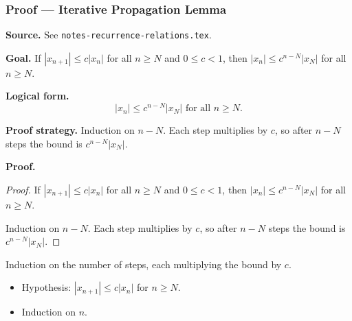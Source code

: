 
\clearpage
{}
\hypertarget{proof-RA-ABB-L-iterative-propagation}{}

\subsubsection[Iterative Propagation Lemma]{Proof --- Iterative Propagation Lemma}

\bigskip

\noindent
\textbf{Source.} See \texttt{notes-recurrence-relations.tex}.

\vspace{0.75em}

\noindent
\textbf{Goal.} If $|x_{n+1}| \le c|x_n|$ for all $n \ge N$ and $0 \le c < 1$, then $|x_n| \le c^{n-N}|x_N|$ for all $n \ge N$.

\vspace{0.75em}

\noindent
\textbf{Logical form.}
\[
  |x_n| \le c^{n-N}|x_N| \text{ for all } n \ge N.
\]

\vspace{0.75em}

\noindent
\textbf{Proof strategy.} Induction on $n - N$. Each step multiplies by $c$, so after $n - N$ steps the bound is $c^{n-N}|x_N|$.

\vspace{0.75em}

\noindent
\textbf{Proof.}
\begin{proof}
\Claim If $|x_{n+1}| \le c|x_n|$ for all $n \ge N$ and $0 \le c < 1$, then $|x_n| \le c^{n-N}|x_N|$ for all $n \ge N$.

\Given 

\Goal 

\Strategy Induction on $n - N$. Each step multiplies by $c$, so after $n - N$ steps the bound is $c^{n-N}|x_N|$.

\medskip


\end{proof}

\begin{remark*}
Induction on the number of steps, each multiplying the bound by $c$.
\end{remark*}

\begin{remark*}[Dependencies]
\begin{itemize}
  \item Hypothesis: $|x_{n+1}| \le c|x_n|$ for $n \ge N$.
  \item Induction on $n$.
\end{itemize}
\end{remark*}
